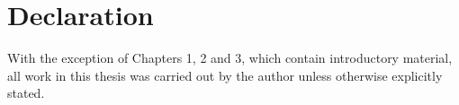 \chapter{Declaration}

With the exception of Chapters 1, 2 and 3, which contain introductory material, all work in this thesis was carried out by the author unless otherwise explicitly stated.

